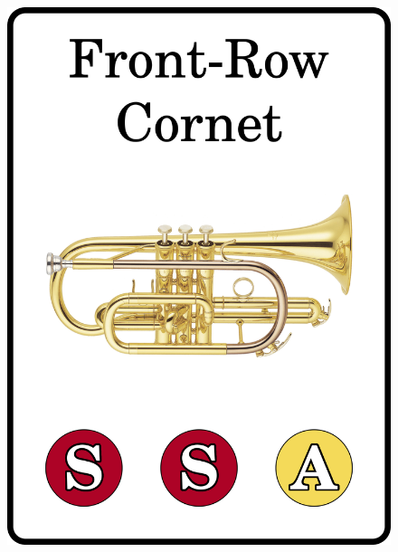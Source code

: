 \documentclass[a6paper, 12pt, parskip=half, DIV=14]{scrartcl}
\begin{document}
\begin{figure}[h]
\centering
    \includegraphics[scale=0.065]{Images/CardImages/cornet_display_front.png}
    \qquad

\end{figure}
\end{document}
